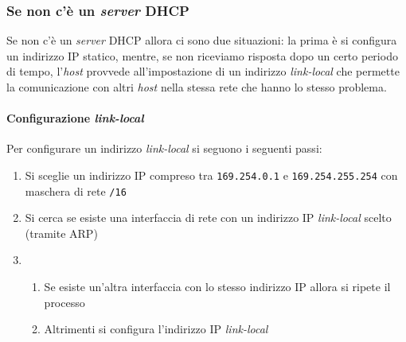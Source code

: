         \subsubsection{Se non c'è un \textit{server} \Acrshort*{DHCP}}
            Se non c'è un \textit{server} \Acrshort*{DHCP} allora ci sono due situazioni: la prima è si configura un indirizzo \Acrshort*{IP} statico, mentre, se non riceviamo risposta dopo un certo periodo di tempo, l'\textit{host} provvede all'impostazione di un indirizzo \textit{link-local} che permette la comunicazione con altri \textit{host} nella stessa rete che hanno lo stesso problema.
            \paragraph{Configurazione \textit{link-local}} Per configurare un indirizzo \textit{link-local} si seguono i seguenti passi: \begin{enumerate}
                \item Si sceglie un indirizzo \Acrshort*{IP} compreso tra \texttt{169.254.0.1} e \texttt{169.254.255.254} con maschera di rete \texttt{/16}
                \item Si cerca se esiste una interfaccia di rete con un indirizzo \Acrshort*{IP} \textit{link-local} scelto (tramite \Acrshort*{ARP})
                \item \begin{enumerate}
                    \item Se esiste un'altra interfaccia con lo stesso indirizzo \Acrshort*{IP} allora si ripete il processo
                    \item Altrimenti si configura l'indirizzo \Acrshort*{IP} \textit{link-local}
                \end{enumerate}
            \end{enumerate}
